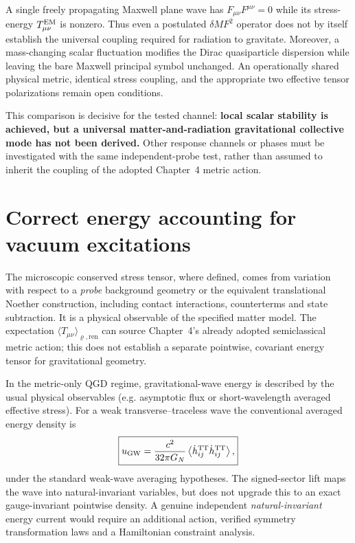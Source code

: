 \documentclass[11pt,a4paper]{article}
\theoremstyle{definition}\newtheorem{definition}[theorem]{Definition}
\theoremstyle{remark}\newtheorem{remark}[theorem]{Remark}
\begin{document}
A single freely propagating Maxwell plane wave has $F_{\mu\nu}F^{\mu\nu}=0$ while its stress-energy $T_{\mu\nu}^{\rm EM}$ is nonzero. Thus even a postulated $\delta M F^2$ operator does not by itself establish the universal coupling required for radiation to gravitate. Moreover, a mass-changing scalar fluctuation modifies the Dirac quasiparticle dispersion while leaving the bare Maxwell principal symbol unchanged. An operationally shared physical metric, identical stress coupling, and the appropriate two effective tensor polarizations remain open conditions.

This comparison is decisive for the tested channel: \textbf{local scalar stability is achieved, but a universal matter-and-radiation gravitational collective mode has not been derived.} Other response channels or phases must be investigated with the same independent-probe test, rather than assumed to inherit the coupling of the adopted Chapter~4 metric action.

\section{Correct energy accounting for vacuum excitations}
\label{sec:waveenergy}
The microscopic conserved stress tensor, where defined, comes from variation with respect to a \emph{probe} background geometry or the equivalent translational Noether construction, including contact interactions, counterterms and state subtraction. It is a physical observable of the specified matter model. The expectation $\langle T_{\mu\nu}\rangle_{\varrho,\mathrm{ren}}$ can source Chapter~4's already adopted semiclassical metric action; this does not establish a separate pointwise, covariant energy tensor for gravitational geometry.

In the metric-only QGD regime, gravitational-wave energy is described by the usual physical observables (e.g. asymptotic flux or short-wavelength averaged effective stress). For a weak transverse--traceless wave the conventional averaged energy density is
\begin{equation}\label{eq:isaacson}
\boxed{u_{\rm GW}=\frac{c^2}{32\pi G_N}\left\langle\dot h^{\rm TT}_{ij}\dot h^{\rm TT}_{ij}\right\rangle,}
\end{equation}
under the standard weak-wave averaging hypotheses. The signed-sector lift maps the wave into natural-invariant variables, but does not upgrade this to an exact gauge-invariant pointwise density. A genuine independent \emph{natural-invariant} energy current would require an additional action, verified symmetry transformation laws and a Hamiltonian constraint analysis.
\end{document}
